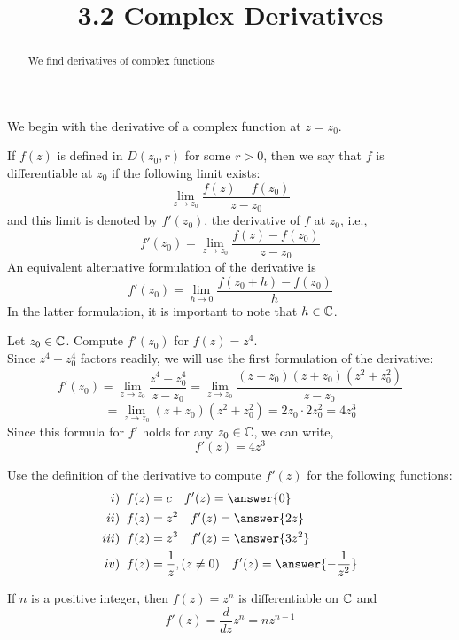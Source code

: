 \documentclass[handout]{ximera}
\title{3.2 Complex Derivatives}
\begin{document}
\begin{abstract}
We find derivatives of complex functions
\end{abstract}

\maketitle



We begin with the derivative of a complex function at $z = z_0$.

\begin{definition}
If $f(z)$ is defined in $D(z_0, r)$ for some $r>0$, then we say that $f$ is differentiable at $z_0$ if the following limit exists:
\[
\lim_{z \to z_0} \frac{f(z) - f(z_0)}{z-z_0}
\]
and this limit is denoted by $f'(z_0)$, the derivative of $f$ at $z_0$, i.e., 
\[
f'(z_0) = \lim_{z \to z_0} \frac{f(z) - f(z_0)}{z-z_0}
\]
An equivalent alternative formulation of the derivative is 
\[
f'(z_0) = \lim_{h \to 0} \frac{f(z_0 +h) -f(z_0)}{h}
\]
In the latter formulation, it is important to note that $h\in  \mathbb C$.
\end{definition}

\begin{example}
Let $z_0 \in \mathbb C$. Compute $f'(z_0)$ for $f(z) = z^4$.\\
Since $z^4 - z_0^4$ factors readily, we will use the first formulation of the derivative:
\[
f'(z_0) =\lim_{z \to z_0} \frac{z^4 - z_0^4}{z-z_0} =\lim_{z \to z_0} \frac{(z-z_0)(z+z_0)(z^2+z_0^2)}{z-z_0}
\]
\[
= \lim_{z \to z_0} (z+z_0)(z^2+z_0^2) = 2z_0\cdot 2z_0^2 = 4z_0^3
\]
Since this formula for $f'$ holds for any $z_0 \in \mathbb C$, we can write,
\[
f'(z) = 4z^3
\]
\end{example}


\begin{problem}
Use the definition of the derivative to compute $f'(z)$ for the following functions:
\begin{align*}
i) \;\; &f(z) = c \quad f'(z) =\answer{0}\\
ii) \;\; &f(z) = z^2 \quad f'(z) =\answer{2z}\\
iii) \;\; &f(z) = z^3 \quad f'(z) =\answer{3z^2}\\
iv) \;\; & f(z) = \frac{1}{z}, (z \neq 0) \quad f'(z) =\answer{-\frac{1}{z^2}}
\end{align*}
\end{problem}

\begin{proposition}
If $n$ is a positive integer, then $f(z) = z^n$ is differentiable on $\mathbb C$ and
\[
f'(z) = \frac{d}{dz} z^n = nz^{n-1}
\]
\end{proposition}
\end{document}

